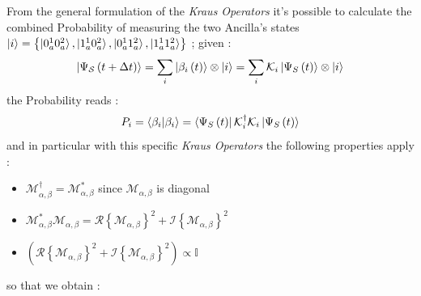 \documentclass[a4paper,12pt]{article}
\begin{document}
\newpage

From the general formulation of the \textit{Kraus Operators} it's possible to calculate the combined Probability of measuring the two Ancilla's states $ \ket{i} = \left\{ \ket{0_{a}^{1}0_{a}^{2}}, \ket{1_{a}^{1}0_{a}^{2}}, \ket{0_{a}^{1}1_{a}^{2}}, \ket{1_{a}^{1}1_{a}^{2}} \right\} $ ; given :
\begin{equation}
		\ket{\Psi_{\mathcal{S}} \left( t + \Delta t\right)} = \sum_{i}{\ket{\beta_{i} \left( t \right)} \otimes \ket{i}} = \sum_{i}{\mathcal{K}_{i} \ket{\Psi_{S} \left( t \right)} \otimes \ket{i} }
\end{equation}
the Probability reads : 
\begin{equation}
	P_{i} = \braket{\beta_{i} | \beta_{i}} = \bra{\Psi_{S} \left( t \right)} \mathcal{K}_{i}^{\dagger} \mathcal{K}_{i} \ket{\Psi_{S} \left( t \right)} 
	\label{eq:prob_kraus_operators_generic}
\end{equation}
and in particular with this specific \textit{Kraus Operators} the following properties apply : 
\begin{itemize}
	\item $ \mathcal{M}_{\alpha,\beta}^{\dagger} = \mathcal{M}_{\alpha,\beta}^{*}  $ since $ \mathcal{M}_{\alpha,\beta} $ is diagonal
	\item $ \mathcal{M}_{\alpha,\beta}^{*} \mathcal{M}_{\alpha,\beta} = \mathcal{R} \left\{ \mathcal{M}_{\alpha,\beta} \right\}^{2} + \mathcal{I} \left\{ \mathcal{M}_{\alpha,\beta} \right\}^{2} $ 
	\item $ \left(\mathcal{R} \left\{ \mathcal{M}_{\alpha,\beta} \right\}^{2} + \mathcal{I} \left\{ \mathcal{M}_{\alpha,\beta} \right\}^{2} \right)\propto \mathbb{I} $ 
\end{itemize} 
so that we obtain : 
\end{document}
